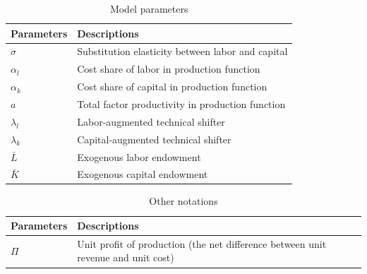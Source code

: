 \documentclass[12pt, a4paper]{article}
\numberwithin{equation}{section}
\numberwithin{figure}{section}
\numberwithin{table}{section}
\begin{document}
\begin{table}[htbp]
	\centering
	\caption{Model parameters}
	\label{v1.0-model-parameters}
	\small
	\begin{tabularx}{\linewidth}{@{} l X @{}}
		\toprule
		\textbf{Parameters} & \textbf{Descriptions} \\
		\midrule
		$\sigma$		& Substitution elasticity between labor and capital \\
		$\alpha_l$ 	& Cost share of labor in production function \\
		$\alpha_k$ 	& Cost share of capital in production function \\
		$a$        		& Total factor productivity in production function \\
		$\lambda_l$	& Labor-augmented technical shifter \\
		$\lambda_k$ 	& Capital-augmented technical shifter \\
		$\bar{L}$		& Exogenous labor endowment \\
		$\bar{K}$		& Exogenous capital endowment \\
		\bottomrule
	\end{tabularx}
\end{table}

\begin{table}[htbp]
	\centering
	\caption{Other notations}
	\label{v1.0-other-notations}
	\small
	\begin{tabularx}{\linewidth}{@{} l X @{}}
		\toprule
		\textbf{Parameters} & \textbf{Descriptions} \\
		\midrule
		$\Pi$	& Unit profit of production (the net difference between unit revenue and unit cost) \\
		\bottomrule
	\end{tabularx}
\end{table}

\end{document}
